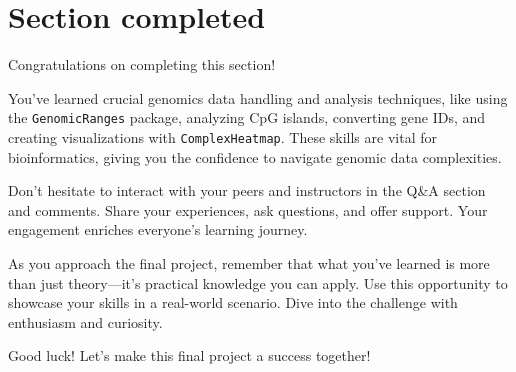 \documentclass[
]{book}
\begin{document}
\hypertarget{section-completed}{%
\section{Section completed}\label{section-completed}}

Congratulations on completing this section!

You've learned crucial genomics data handling and analysis techniques, like using the \texttt{GenomicRanges} package, analyzing CpG islands, converting gene IDs, and creating visualizations with \texttt{ComplexHeatmap}. These skills are vital for bioinformatics, giving you the confidence to navigate genomic data complexities.

Don't hesitate to interact with your peers and instructors in the Q\&A section and comments. Share your experiences, ask questions, and offer support. Your engagement enriches everyone's learning journey.

As you approach the final project, remember that what you've learned is more than just theory---it's practical knowledge you can apply. Use this opportunity to showcase your skills in a real-world scenario. Dive into the challenge with enthusiasm and curiosity.

Good luck!
Let's make this final project a success together!

  
\end{document}
